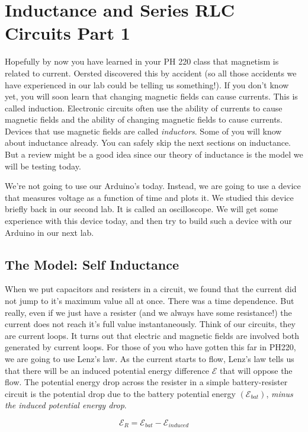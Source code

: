\chapter{Inductance and Series RLC Circuits Part 1}
Hopefully by now you have learned in your PH 220 class that magnetism is related to current. Oersted discovered this by accident (so all those accidents we have experienced in our lab could be telling us something!). If you don't know yet, you will soon learn that changing magnetic fields can cause currents. This is called induction. Electronic circuits often use the ability of currents to cause magnetic fields and the ability of changing magnetic fields to cause currents. Devices that use magnetic fields are called \emph{inductors}. Some of you will know about inductance already. You can safely skip the next sections on inductance.  But a review might be a good idea since our theory of inductance is the model we will be testing today. 

We're not going to use our Arduino's today. Instead, we are going to use a device that measures voltage as a function of time and plots it. We studied this device briefly back in our second lab. It is called an oscilloscope. We will get some experience with this device today, and then try to build such a device with our Arduino in our next lab.

\section{The Model: Self Inductance}

When we put capacitors and resisters in a circuit, we found that the current did not jump to it's maximum value all at once. There was a time dependence. But really, even if we just have a resister (and we always have some resistance!) the current does not reach it's full value instantaneously. Think of our circuits, they are current loops. It turns out that electric and magnetic fields are involved both generated by current loops. For those of you who have gotten this far in PH220, we are going to use Lenz's law. As the current starts to flow, Lenz's law tells us that there will be an induced potential energy difference $\mathcal{E}$  that will oppose the flow. The potential energy drop across the resister in a simple battery-resister circuit is the potential drop due to the battery potential energy $(\mathcal{E}_{bat})$, \emph{minus the induced potential energy drop}.

\begin{equation*}
	\mathcal{E}_{R}=\mathcal{E}_{bat}-	\mathcal{E}_{induced}
\end{equation*}

